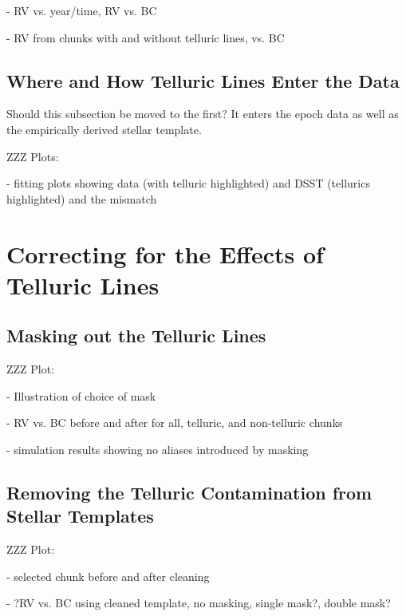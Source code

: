\documentclass{emulateapj}
\begin{document}
\begin{CJK*}{UTF8}{gbsn}
- RV vs. year/time, RV vs. BC

- RV from chunks with and without telluric lines, vs. BC


\subsection{Where and How Telluric Lines Enter the Data}

Should this subsection be moved to the first?
It enters the epoch data as well as the empirically derived stellar template.

ZZZ Plots:

- fitting plots showing data (with telluric highlighted) and DSST
(tellurics highlighted) and the mismatch


\section{Correcting for the Effects of Telluric Lines}


\subsection{Masking out the Telluric Lines}

ZZZ Plot:

- Illustration of choice of mask

- RV vs. BC before and after for all, telluric, and non-telluric chunks

- simulation results showing no aliases introduced by masking


\subsection{Removing the Telluric Contamination from Stellar Templates}

ZZZ Plot:

- selected chunk before and after cleaning

- ?RV vs. BC using cleaned template, no masking, single mask?, double mask?



\end{CJK*}
\end{document}
